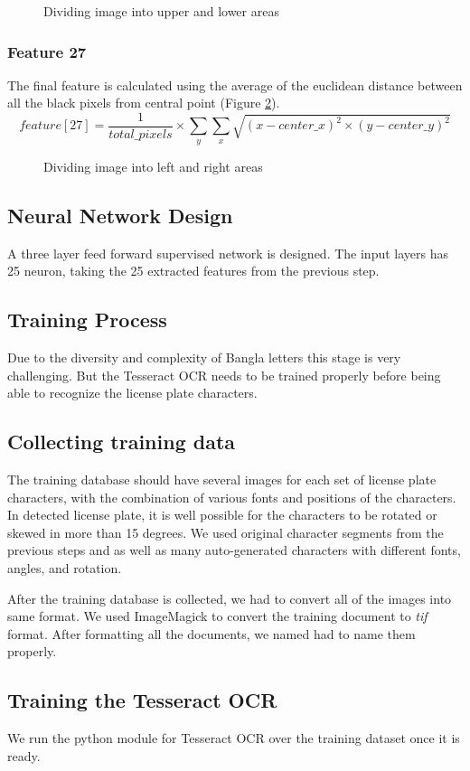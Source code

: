 \documentclass{standalone}
\begin{document}
\begin{figure}
\centering
\caption{Dividing image into upper and lower areas}
\label{fig:FeatureEights}
\end{figure}

\subsubsection{Feature 27}
The final feature is calculated using the average of the euclidean distance between all the black pixels from central point (Figure \ref{fig:FeatureDist}).
\begin{equation}
feature[27] = \dfrac{1}{total\_pixels} \times \sum_{y}{\sum_{x}{ \sqrt{(x-center\_x)^2 \times (y-center\_y)^2} }}
\end{equation}


\begin{figure}
\centering
\caption{Dividing image into left and right areas}
\label{fig:FeatureDist}
\end{figure}








\subsection{Neural Network Design}
A three layer feed forward supervised network is designed. The input layers has 25 neuron, taking the 25 extracted features from the previous step. 


\subsection{Training Process}
Due to the diversity and complexity of Bangla letters this stage is very challenging. But the Tesseract OCR needs to be trained properly before being able to recognize the license plate characters.

\subsection{Collecting training data}
The training database should have several images for each set of license plate characters, with the combination of various fonts and positions of the characters. In detected license plate, it is well possible for the characters to be rotated or skewed in more than 15 degrees. We used original character segments from the previous steps and as well as many auto-generated characters with different fonts, angles, and rotation. 

After the training database is collected, we had to convert all of the images into same format. We used ImageMagick to convert the training document to {\it tif} format. After formatting all the documents, we named had to name them properly. 

\subsection{Training the Tesseract OCR}
We run the python module for Tesseract OCR over the training dataset once it is ready. 
\end{document}
